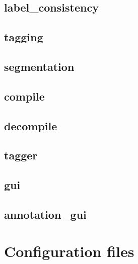 \documentclass[12pt]{article}
\begin{document}
        \subsection{label\_consistency}
        \label{subsec:module-label-consistency}
        

        \subsection{tagging}
        \label{subsec:module-tagging}
        

        \subsection{segmentation}
        \label{subsec:module-segmentation}
        

        \subsection{compile}
        \label{subsec:module-compile}
        

        \subsection{decompile}
        \label{subsec:module-decompile}
        

        \subsection{tagger}
        \label{subsec:module-tagger}
        

        \subsection{gui}
        \label{subsec:module-gui}
        

        \subsection{annotation\_gui}
        \label{subsec:module-annotation-gui}
        
    
    \section{Configuration files}
    \label{sec:config-files}
\end{document}
